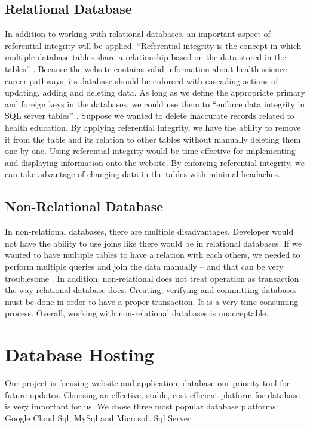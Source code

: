 \documentclass[letterpaper,10pt, draftclsnofoot,onecolumn]{IEEEtran}
\begin{document}
{{{\subsection[Relational Database]{\color{black}
Relational Database}
{\color{black}\normalsize\noindent
{In addition to working with relational databases, an important aspect of referential integrity will be applied. 
“Referential integrity is the concept in which multiple database tables share a relationship based on the data stored in the tables” \cite{IEEEexample:article1}. 
Because the website contains valid information about health science career pathways, its database should be enforced with cascading actions of updating, adding and deleting data. 
As long as we define the appropriate primary and foreign keys in the databases, we could use them to “enforce data integrity in SQL server tables” \cite{IEEEexample:article2}. 
Suppose we wanted to delete inaccurate records related to health education.
By applying referential integrity, we have the ability to remove it from the table and its relation to other tables without manually deleting them one by one. 
Using referential integrity would be time effective for implementing and displaying information onto the website. 
By enforcing referential integrity, we can take advantage of changing data in the tables with minimal headaches. 
}



\subsection[Non-Relational Database]{\color{black}
Non-Relational Database}
{\color{black}\normalsize\noindent
{In non-relational databases, there are multiple disadvantages. 
Developer would not have the ability to use joins like there would be in relational databases. 
If we wanted to have multiple tables to have a relation with each others, we needed to perform multiple queries and join the data manually – and that can be very troublesome \cite{IEEEexample:article}. 
In addition, non-relational does not treat operation as transaction the way relational database does. 
Creating, verifying and committing databases must be done in order to have a proper transaction. 
It is a very time-consuming process. 
Overall, working with non-relational databases is unacceptable. 
}


\section[Database Hosting]{\color{black}
Database Hosting}
\noindent Our project is focusing website and application, database our priority tool for future updates. Choosing an effective, stable, cost-efficient platform for database is very important for us. We chose three most popular database platforms: Google Cloud Sql, MySql and Microsoft Sql Server. 

}}}}}
\end{document}
